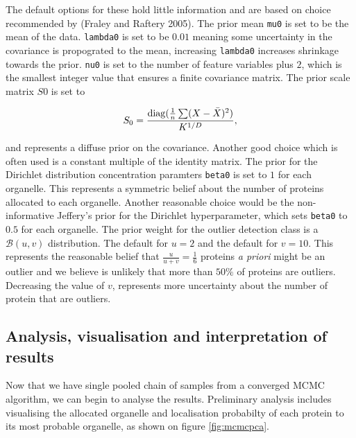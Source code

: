\documentclass[]{article}
\begin{document}
The default options for these hold little information and are based on
choice recommended by (Fraley and Raftery 2005). The prior mean
\texttt{mu0} is set to be the mean of the data. \texttt{lambda0} is set
to be \(0.01\) meaning some uncertainty in the covariance is propograted
to the mean, increasing \texttt{lambda0} increases shrinkage towards the
prior. \texttt{nu0} is set to the number of feature variables plus
\(2\), which is the smallest integer value that ensures a finite
covariance matrix. The prior scale matrix \(S0\) is set to

\begin{equation}
S_0 = \frac{\mathop{\mathrm{diag}}(\frac{1}{n}\sum (X - \bar{X})^2)}{K^{1/D}},
\end{equation}

and represents a diffuse prior on the covariance. Another good choice
which is often used is a constant multiple of the identity matrix. The
prior for the Dirichlet distribution concentration paramters
\texttt{beta0} is set to \(1\) for each organelle. This represents a
symmetric belief about the number of proteins allocated to each
organelle. Another reasonable choice would be the non-informative
Jeffery's prior for the Dirichlet hyperparameter, which sets
\texttt{beta0} to \(0.5\) for each organelle. The prior weight for the
outlier detection class is a \(\mathcal{B}(u, v)\) distribution. The
default for \(u = 2\) and the default for \(v = 10\). This represents
the reasonable belief that \(\frac{u}{u + v} = \frac{1}{6}\) proteins
\emph{a priori} might be an outlier and we believe is unlikely that more
than \(50\%\) of proteins are outliers. Decreasing the value of \(v\),
represents more uncertainty about the number of protein that are
outliers.

\subsection{Analysis, visualisation and interpretation of
results}\label{analysis-visualisation-and-interpretation-of-results}

Now that we have single pooled chain of samples from a converged MCMC
algorithm, we can begin to analyse the results. Preliminary analysis
includes visualising the allocated organelle and localisation probabilty
of each protein to its most probable organelle, as shown on figure
\ref{fig:mcmcpca}.
\end{document}
